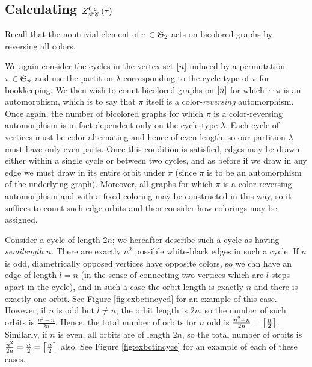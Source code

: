 \documentclass[sectionflow,singlespace,twoside,boldmathhdr,draft]{brandiss} %
\numberwithin{section}{chapter}
\numberwithin{figure}{chapter}
\begin{document}
\subsection{Calculating $\gci{\symgp{2}}{\specname{BC}} \pbrac{\tau}$}\label{ss:tcibc}
Recall that the nontrivial element of $\tau \in \symgp{2}$ acts on bicolored graphs by reversing all colors.

We again consider the cycles in the vertex set $\sbrac{n}$ induced by a permutation $\pi \in \symgp{n}$ and use the partition $\lambda$ corresponding to the cycle type of $\pi$ for bookkeeping.
We then wish to count bicolored graphs on $\sbrac{n}$ for which $\tau \cdot \pi$ is an automorphism, which is to say that $\pi$ itself is a color-\emph{reversing} automorphism.
Once again, the number of bicolored graphs for which $\pi$ is a color-reversing automorphism is in fact dependent only on the cycle type $\lambda$.
Each cycle of vertices must be color-alternating and hence of even length, so our partition $\lambda$ must have only even parts.
Once this condition is satisfied, edges may be drawn either within a single cycle or between two cycles, and as before if we draw in any edge we must draw in its entire orbit under $\pi$ (since $\pi$ is to be an automorphism of the underlying graph).
Moreover, all graphs for which $\pi$ is a color-reversing automorphism and with a fixed coloring may be constructed in this way, so it suffices to count such edge orbits and then consider how colorings may be assigned.

Consider a cycle of length $2n$; we hereafter describe such a cycle as having \emph{semilength} $n$.
There are exactly $n^{2}$ possible white-black edges in such a cycle.
If $n$ is odd, diametrically opposed vertices have opposite colors, so we can have an edge of length $l = n$ (in the sense of connecting two vertices which are $l$ steps apart in the cycle), and in such a case the orbit length is exactly $n$ and there is exactly one orbit.
See Figure \ref{fig:exbctincycd} for an example of this case.
However, if $n$ is odd but $l \neq n$, the orbit length is $2n$, so the number of such orbits is $\frac{n^{2} - n}{2n}$.
Hence, the total number of orbits for $n$ odd is $\frac{n^2 + n}{2n} = \ceil{\frac{n}{2}}$.
Similarly, if $n$ is even, all orbits are of length $2n$, so the total number of orbits is $\frac{n^{2}}{2n} = \frac{n}{2} = \ceil{\frac{n}{2}}$ also.
See Figure \ref{fig:exbctincyce} for an example of each of these cases.
\end{document}
